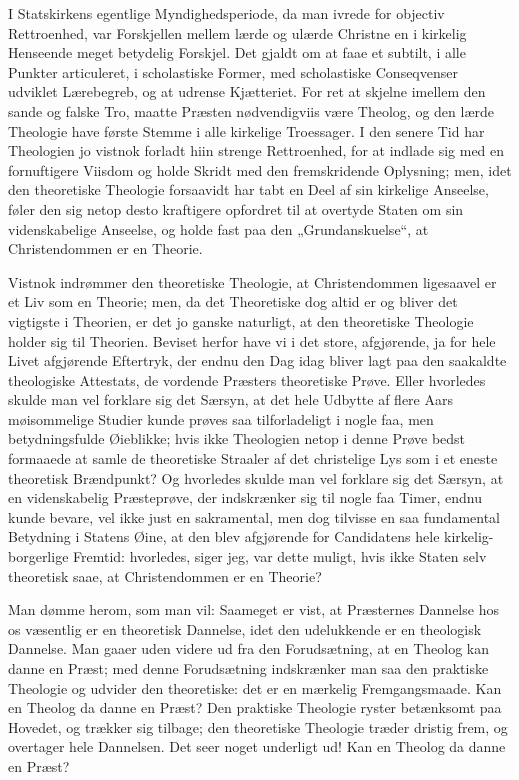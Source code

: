 \documentclass[12pt,a4paper]{book}
\newcommand{\opage}[1]{\marginnote{\footnotesize\textit{[#1]}}}
\begin{document}
\opage{132} I Statskirkens egentlige Myndighedsperiode, da man ivrede for objectiv
Rettroenhed, var Forskjellen mellem lærde og ulærde Christne en i kirkelig
Henseende meget betydelig Forskjel. Det gjaldt om at faae et subtilt, i
alle Punkter articuleret, i scholastiske Former, med scholastiske
Conseqvenser udviklet Lærebegreb, og at udrense Kjætteriet. For ret at
skjelne imellem den sande og falske Tro, maatte Præsten nødvendigviis være
Theolog, og den lærde Theologie have første Stemme i alle kirkelige
Troessager. I den senere Tid har Theologien jo vistnok forladt hiin strenge
Rettroenhed, for at indlade sig med en fornuftigere Viisdom og holde Skridt
med den fremskridende Oplysning; men, idet den theoretiske Theologie
forsaavidt har tabt en Deel af sin kirkelige Anseelse, føler den sig netop
desto kraftigere opfordret til at overtyde Staten om sin videnskabelige
Anseelse, og holde fast paa den „Grundanskuelse“, at Christendommen er en
Theorie.

Vistnok indrømmer den theoretiske Theologie, at Christendommen ligesaavel
er et Liv som en Theorie; men, da det Theoretiske dog altid er og bliver
det vigtigste i Theorien, er det jo ganske naturligt, at den theoretiske
Theologie holder sig til Theorien. Beviset herfor have vi i det store,
afgjørende, ja for hele Livet afgjørende Eftertryk, der endnu den Dag idag
bliver lagt paa den saakaldte theologiske Attestats, de vordende Præsters
theoretiske Prøve. Eller hvorledes skulde man vel forklare sig det Særsyn,
at det hele Udbytte af flere Aars møisommelige Studier kunde prøves saa
tilforladeligt i nogle faa, men betydningsfulde Øieblikke; hvis ikke
Theologien netop i denne Prøve bedst formaaede at samle de theoretiske
Straaler af det christelige Lys som i et eneste theoretisk Brændpunkt? Og
hvorledes skulde man vel forklare sig det Særsyn, at en videnskabelig
Præsteprøve, der indskrænker sig til nogle faa Timer, endnu kunde bevare,
vel ikke just en sakramental, men dog tilvisse en saa fundamental Betydning
i Statens Øine, at den blev afgjørende for Candidatens
\opage{133} hele kirkelig-borgerlige Fremtid: hvorledes, siger jeg, var dette muligt,
hvis ikke Staten selv theoretisk saae, at Christendommen er en Theorie?

Man dømme herom, som man vil: Saameget er vist, at Præsternes Dannelse hos
os væsentlig er en theoretisk Dannelse, idet den udelukkende er en
theologisk Dannelse. Man gaaer uden videre ud fra den Forudsætning, at en
Theolog kan danne en Præst; med denne Forudsætning indskrænker man saa den
praktiske Theologie og udvider den theoretiske: det er en mærkelig
Fremgangsmaade. Kan en Theolog da danne en Præst? Den praktiske Theologie
ryster betænksomt paa Hovedet, og trækker sig tilbage; den theoretiske
Theologie træder dristig frem, og overtager hele Dannelsen. Det seer noget
underligt ud! Kan en Theolog da danne en Præst?
\end{document}
